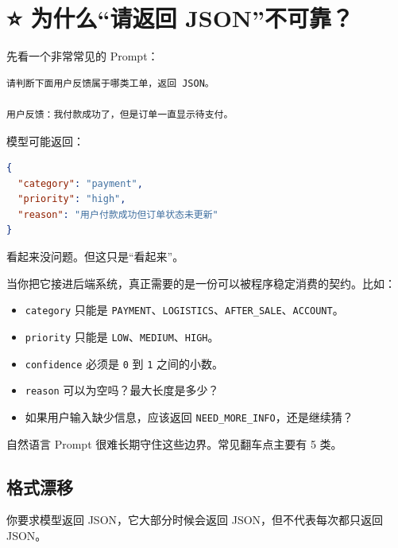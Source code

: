 \documentclass[10pt,a4paper]{ctexart}
\begin{document}
\section{⭐️ 为什么“请返回 JSON”不可靠？}


先看一个非常常见的 Prompt：



\begin{lstlisting}
请判断下面用户反馈属于哪类工单，返回 JSON。

用户反馈：我付款成功了，但是订单一直显示待支付。
\end{lstlisting}



模型可能返回：



\begin{lstlisting}[language=json]
{
  "category": "payment",
  "priority": "high",
  "reason": "用户付款成功但订单状态未更新"
}
\end{lstlisting}



看起来没问题。但这只是“看起来”。



当你把它接进后端系统，真正需要的是一份可以被程序稳定消费的契约。比如：


\begin{itemize}[itemsep=2pt, topsep=4pt]
  \item \texttt{category} 只能是 \texttt{PAYMENT}、\texttt{LOGISTICS}、\texttt{AFTER\_SALE}、\texttt{ACCOUNT}。
  \item \texttt{priority} 只能是 \texttt{LOW}、\texttt{MEDIUM}、\texttt{HIGH}。
  \item \texttt{confidence} 必须是 \texttt{0} 到 \texttt{1} 之间的小数。
  \item \texttt{reason} 可以为空吗？最大长度是多少？
  \item 如果用户输入缺少信息，应该返回 \texttt{NEED\_MORE\_INFO}，还是继续猜？
\end{itemize}


自然语言 Prompt 很难长期守住这些边界。常见翻车点主要有 5 类。



\subsection{格式漂移}


你要求模型返回 JSON，它大部分时候会返回 JSON，但不代表每次都只返回 JSON。
\end{document}
